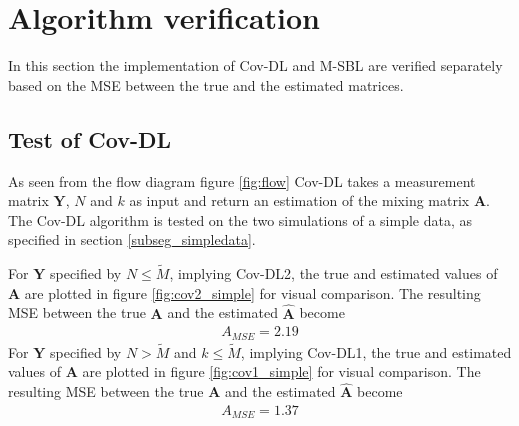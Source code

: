 \section{Algorithm verification}
In this section the implementation of Cov-DL and M-SBL are verified separately based on the MSE between the true and the estimated matrices.

\subsection{Test of Cov-DL}
As seen from the flow diagram figure \ref{fig:flow} Cov-DL takes a measurement matrix $\textbf{Y}$, $N$ and $k$ as input and return an estimation of the mixing matrix $\textbf{A}$. The Cov-DL algorithm is tested on the two simulations of a simple data, as specified in section \ref{subseg_simpledata}. 

For $\textbf{Y}$ specified by $N\leq \widetilde{M}$, implying Cov-DL2, the true and estimated values of $\textbf{A}$ are plotted in figure \ref{fig:cov2_simple} for visual comparison.
The resulting MSE between the true $\textbf{A}$ and the estimated $\hat{\textbf{A}}$ become 
\begin{align*}
A_{MSE} = 2.19 
\end{align*}
For $\textbf{Y}$ specified by $N > \widetilde{M}$ and $k\leq \widetilde{M}$, implying Cov-DL1, the true and estimated values of $\textbf{A}$ are plotted in figure \ref{fig:cov1_simple} for visual comparison.
The resulting MSE between the true $\textbf{A}$ and the estimated $\hat{\textbf{A}}$ become 
\begin{align*}
A_{MSE} = 1.37
\end{align*}

